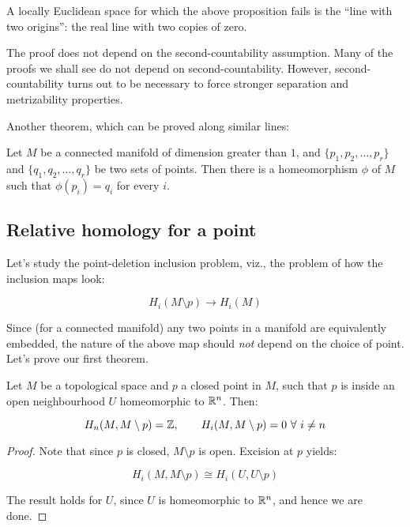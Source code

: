 \documentclass[a4paper]{amsart}
\begin{document}
A locally Euclidean space for which the above proposition fails is the
``line with two origins'': the real line with two copies of zero.

The proof does not depend on the second-countability assumption. Many
of the proofs we shall see do not depend on
second-countability. However, second-countability turns out to be
necessary to force stronger separation and metrizability properties.

Another theorem, which can be proved along similar lines:

\begin{theorem}
  Let $M$ be a connected manifold of dimension greater than $1$, and
  $\{ p_1, p_2, \ldots, p_r \}$ and $\{ q_1, q_2, \ldots, q_r \}$ be
  two sets of points.  Then there is a homeomorphism $\phi$ of $M$
  such that $\phi(p_i) = q_i$ for every $i$.
\end{theorem}

\subsection{Relative homology for a point}

Let's study the point-deletion inclusion problem, viz., the problem of
how the inclusion maps look:

$$H_i(M \setminus p) \to H_i(M)$$

Since (for a connected manifold) any two points in a manifold are
equivalently embedded, the nature of the above map should {\em not}
depend on the choice of point. Let's prove our first theorem.

\begin{theorem}
  Let $M$ be a topological space and $p$ a closed point in $M$, such
  that $p$ is inside an open neighbourhood $U$ homeomorphic to $\mathbb{R}^n$. Then:

  $$H_n(M, M \setminus p) = \mathbb{Z}, \qquad H_i(M, M \setminus p) = 0 \ \forall \ i \ne n$$
\end{theorem}

\begin{proof}
  Note that since $p$ is closed, $M \setminus p$ is open. Excision at
  $p$ yields:

  $$H_i(M, M \setminus p) \cong H_i(U, U \setminus p)$$

  The result holds for $U$, since $U$ is homeomorphic to $\mathbb{R}^n$, and
  hence we are done.
\end{proof}
\end{document}
